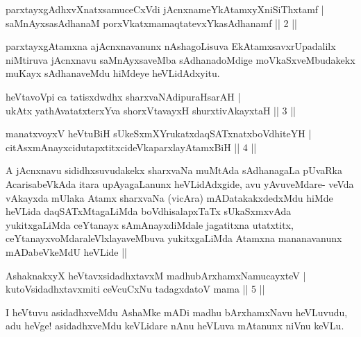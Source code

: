 \begin{shl}
parxtayxgAdhxvXnatxsamuceCxVdi jAcnxnameYkAtamxyXniSiThxtamf |\\
saMnAyxsasAdhanaM porxVkatxmamaqtatevxYkasAdhanamf \hfill || 2 ||
\end{shl}

\begin{artha}
parxtayxgAtamxna ajAcnxnavanunx nAshagoLisuva EkAtamxsavxrUpadalilx niMtiruva jAcnxnavu saMnAyxsaveMba sAdhanadoMdige moVkaSxveMbudakekx muKayx sAdhanaveMdu hiMdeye heVLidAdxyitu.
\end{artha}


\begin{shl}
heVtavoV\s pi ca tatisxdwdhx sharxvaNAdipuraHsarAH |\\
ukAtx yathAvatatxterxYva shorxVtavayxH shurxtivAkayxtaH \hfill || 3 ||
\end{shl}
\begin{shl}
manatxvoyxV heVtuBiH sUkeSxmXYrukatxdaqSATxnatxboVdhiteYH |\\
citAsxmAnayxcidutapxtitxcideVkaparxlayAtamxBiH \hfill || 4 ||
\end{shl}

\begin{artha}
A jAcnxnavu sididhxsuvudakekx sharxvaNa muMtAda sAdhanagaLa pUvaRka
AcarisabeVkAda itara upAyagaLanunx heVLidAdxgide, avu yAvuveMdare-
veVda vAkayxda mUlaka Atamx sharxvaNa (vicAra) mADatakakxdedxMdu hiMde
heVLida daqSATxMtagaLiMda boVdhisalapxTaTx sUkaSxmxvAda yukitxgaLiMda
ceYtanayx sAmAnayxdiMdale jagatitxna utatxtitx,
ceYtanayxvoMdaraleVlxlayaveMbuva yukitxgaLiMda Atamxna mananavanunx
mADabeVkeMdU heVLide ||
\end{artha}


\begin{shl}
AshaknakxyX heVtavxsidadhxtavxM madhubArxhamxNamucayxteV |\\
kutoV\s sidadhxtavxmiti ceVcuCxNu tadagxdatoV mama \hfill || 5 ||
\end{shl}

\begin{artha}
I heVtuvu asidadhxveMdu AshaMke mADi madhu bArxhamxNavu heVLuvudu, adu heVge! asidadhxveMdu keVLidare nAnu heVLuva mAtanunx niVnu keVLu.
\end{artha}

